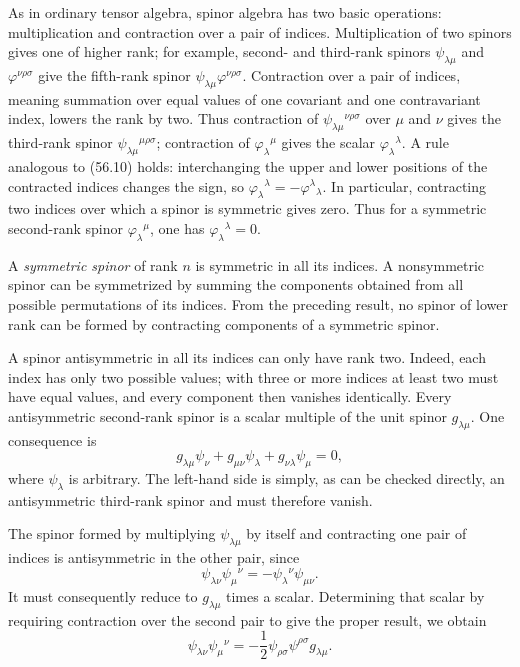 As in ordinary tensor algebra, spinor algebra has two basic operations:
multiplication and contraction over a pair of indices. Multiplication of two
spinors gives one of higher rank; for example, second- and third-rank spinors
$\psi_{\lambda\mu}$ and $\varphi^{\nu\rho\sigma}$ give the fifth-rank
spinor $\psi_{\lambda\mu}\varphi^{\nu\rho\sigma}$. Contraction over a pair
of indices, meaning summation over equal values of one covariant and one
contravariant index, lowers the rank by two. Thus contraction of
$\psi_{\lambda\mu}{}^{\nu\rho\sigma}$ over $\mu$ and $\nu$ gives the
third-rank spinor $\psi_{\lambda\mu}{}^{\mu\rho\sigma}$; contraction of
$\varphi_\lambda{}^\mu$ gives the scalar
$\varphi_\lambda{}^\lambda$. A rule analogous to (56.10) holds: interchanging
the upper and lower positions of the contracted indices changes the sign,
so $\varphi_\lambda{}^\lambda=-\varphi^\lambda{}_{\lambda}$. In particular,
contracting two indices over which a spinor is symmetric gives zero. Thus for
a symmetric second-rank spinor $\varphi_\lambda{}^\mu$, one has
$\varphi_\lambda{}^\lambda=0$.

A \emph{symmetric spinor} of rank $n$ is symmetric in all its indices. A
nonsymmetric spinor can be symmetrized by summing the components obtained from
all possible permutations of its indices. From the preceding result, no
spinor of lower rank can be formed by contracting components of a symmetric
spinor.

A spinor antisymmetric in all its indices can only have rank two. Indeed, each
index has only two possible values; with three or more indices at least two
must have equal values, and every component then vanishes identically. Every
antisymmetric second-rank spinor is a scalar multiple of the unit spinor
$g_{\lambda\mu}$. One consequence is
\begin{equation}
 g_{\lambda\mu}\psi_\nu+g_{\mu\nu}\psi_\lambda
 +g_{\nu\lambda}\psi_\mu=0,
 \tag{56.17}
\end{equation}
where $\psi_\lambda$ is arbitrary. The left-hand side is simply, as can be
checked directly, an antisymmetric third-rank spinor and must therefore
vanish.

The spinor formed by multiplying $\psi_{\lambda\mu}$ by itself and
contracting one pair of indices is antisymmetric in the other pair, since
\[
 \psi_{\lambda\nu}\psi_\mu{}^\nu
 =-\psi_\lambda{}^\nu\psi_{\mu\nu}.
\]
It must consequently reduce to $g_{\lambda\mu}$ times a scalar. Determining
that scalar by requiring contraction over the second pair to give the proper
result, we obtain
\begin{equation}
 \psi_{\lambda\nu}\psi_\mu{}^\nu
 =-\frac12\psi_{\rho\sigma}\psi^{\rho\sigma}g_{\lambda\mu}.
 \tag{56.18}
\end{equation}



